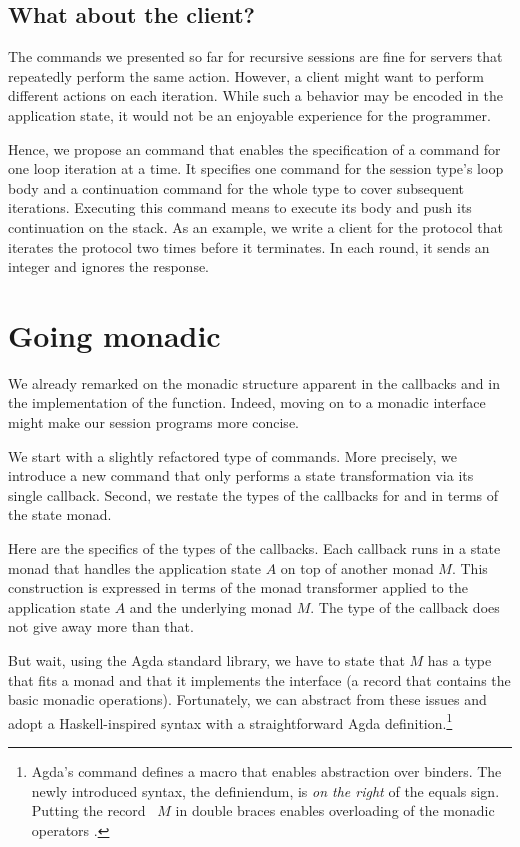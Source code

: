 \documentclass[acmsmall,screen,anonymous,review]{acmart}
\begin{document}
\subsection{What about the client?}
\label{sec:what-about-client}

The commands we presented so far for recursive sessions are fine for
servers that repeatedly perform the same action. However, a client
might want to perform different actions on each iteration. While such
a behavior may be encoded in the application state, it would not be an
enjoyable experience for the programmer.

Hence, we propose an {\AUNROLL} command that
enables the specification of a command for one loop iteration at a time.
\rstCommandUNROLL
It specifies one command for the session type's loop body and a
continuation command for the whole type to cover subsequent
iterations. 
Executing this command means to execute its body and push its
continuation on the stack.
\rstExecutorUNROLL
As an example, we write a client for the {\Amanyunaryp} protocol that
iterates the protocol two times before it terminates. In each round,
it sends an integer and ignores the response.
\rstClientExample

\section{Going monadic}
\label{sec:going-monadic}


We already remarked on the monadic structure apparent in the
callbacks and in the implementation of the {\Aexecutor}
function. Indeed, moving on to a monadic interface might make our session
programs more concise.

We start with a slightly refactored type of commands. More precisely,
we introduce a new {\ACSKIP} command that only performs a state 
transformation via its single callback.
Second, we restate the types of the callbacks for {\ACSEND} and
{\ACRECV} in terms of the state monad.

\mstCommand

Here are the specifics of the types of the callbacks. Each callback
runs in a state monad that handles the application state $A$ on top of
another monad $M$. This construction is expressed in terms of the
monad transformer {\AStateT} applied to the application state
$A$ and the underlying monad $M$. The type of the callback does not give away more
than that.

But wait, using the Agda standard library, we have to state that $M$
has a type that fits a monad and that it implements the
interface {\ARawMonad} (a record that contains the basic monadic
operations).
Fortunately, we can abstract from these issues and adopt a
Haskell-inspired syntax with a straightforward
Agda definition.\footnote{Agda's  command defines
  a macro that enables abstraction over binders. The newly introduced
  syntax, the definiendum, is \emph{on the right} of the equals
  sign. Putting the record {\ARawMonad~$M$} in double braces enables overloading of the
  monadic operators \cite{DBLP:conf/icfp/DevrieseP11}.}
\mstMonadic
\end{document}
